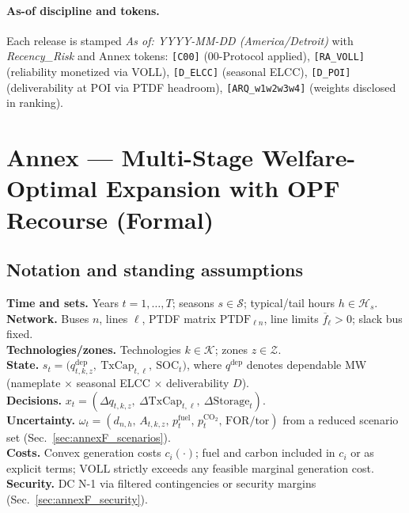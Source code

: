 \documentclass[11pt]{article}
\numberwithin{equation}{section}
\theoremstyle{definition}
\theoremstyle{remark}
\begin{document}
\paragraph{As-of discipline and tokens.}
Each release is stamped \emph{As of: YYYY-MM-DD (America/Detroit)} with \emph{Recency\_Risk} and Annex tokens: \texttt{[C00]} (00-Protocol applied), \texttt{[RA\_VOLL]} (reliability monetized via VOLL), \texttt{[D\_ELCC]} (seasonal ELCC), \texttt{[D\_POI]} (deliverability at POI via PTDF headroom), \texttt{[ARQ\_w1w2w3w4]} (weights disclosed in ranking).


\section{Annex — Multi-Stage Welfare-Optimal Expansion with OPF Recourse (Formal)}
\label{sec:annexF}

\subsection{ Notation and standing assumptions}

\noindent\textbf{Time and sets.} Years $t=1,\dots,T$; seasons $s\in\mathcal{S}$; typical/tail hours $h\in\mathcal{H}_s$.\\
\textbf{Network.} Buses $n$, lines $\ell$, PTDF matrix $\mathrm{PTDF}_{\ell n}$, line limits $\overline f_\ell>0$; slack bus fixed.\\
\textbf{Technologies/zones.} Technologies $k\in\mathcal{K}$; zones $z\in\mathcal{Z}$.\\
\textbf{State.} $s_t=\big(q^{\mathrm{dep}}_{t,k,z},\ \mathrm{TxCap}_{t,\ell},\ \mathrm{SOC}_{t}\big)$, where $q^{\mathrm{dep}}$ denotes dependable MW (nameplate $\times$ seasonal ELCC $\times$ deliverability $D$).\\
\textbf{Decisions.} $x_t=(\Delta q_{t,k,z},\ \Delta\mathrm{TxCap}_{t,\ell},\ \Delta\mathrm{Storage}_{t})$.\\
\textbf{Uncertainty.} $\omega_t=(d_{n,h},\,A_{t,k,z},\,p^{\mathrm{fuel}}_{t},\,p^{\mathrm{CO}_2}_{t},\,\text{FOR/tor})$ from a reduced scenario set (Sec.~\ref{sec:annexF_scenarios}).\\
\textbf{Costs.} Convex generation costs $c_i(\cdot)$; fuel and carbon included in $c_i$ or as explicit terms; $\mathrm{VOLL}$ strictly exceeds any feasible marginal generation cost.\\
\textbf{Security.} DC N-1 via filtered contingencies or security margins (Sec.~\ref{sec:annexF_security}).
\end{document}
